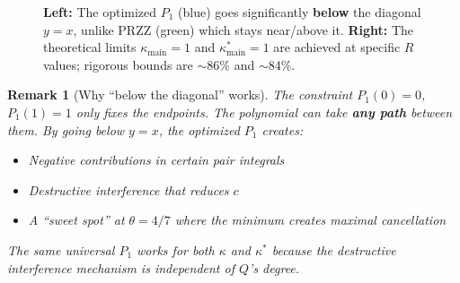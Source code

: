 \documentclass[11pt]{article}
\newtheorem{remark}{Remark}
\begin{document}
\begin{figure}[h]
\caption{\textbf{Left:} The optimized $P_1$ (blue) goes significantly \textbf{below} the diagonal $y = x$, unlike PRZZ (green) which stays near/above it. \textbf{Right:} The theoretical limits $\kappa_{\text{main}} = 1$ and $\kappa^*_{\text{main}} = 1$ are achieved at specific $R$ values; rigorous bounds are $\sim$86\% and $\sim$84\%.}
\label{fig:breakthrough}
\end{figure}

\begin{remark}[Why ``below the diagonal'' works]
The constraint $P_1(0) = 0$, $P_1(1) = 1$ only fixes the endpoints. The polynomial can take \textbf{any path} between them. By going below $y = x$, the optimized $P_1$ creates:
\begin{itemize}
\item Negative contributions in certain pair integrals
\item Destructive interference that reduces $c$
\item A ``sweet spot'' at $\theta = 4/7$ where the minimum creates maximal cancellation
\end{itemize}
The same universal $P_1$ works for both $\kappa$ and $\kappa^*$ because the destructive interference mechanism is independent of $Q$'s degree.
\end{remark}

\end{document}
